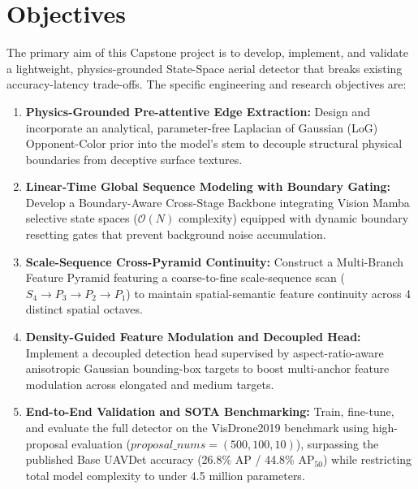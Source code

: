 \documentclass[12pt,a4paper]{report}
\begin{document}
\section{Objectives}
The primary aim of this Capstone project is to develop, implement, and validate a lightweight, physics-grounded State-Space aerial detector that breaks existing accuracy-latency trade-offs. The specific engineering and research objectives are:
\begin{enumerate}[leftmargin=2em]
    \item \textbf{Physics-Grounded Pre-attentive Edge Extraction:} Design and incorporate an analytical, parameter-free Laplacian of Gaussian (LoG) Opponent-Color prior into the model's stem to decouple structural physical boundaries from deceptive surface textures.
    \item \textbf{Linear-Time Global Sequence Modeling with Boundary Gating:} Develop a Boundary-Aware Cross-Stage Backbone integrating Vision Mamba selective state spaces ($\mathcal{O}(N)$ complexity) equipped with dynamic boundary resetting gates that prevent background noise accumulation.
    \item \textbf{Scale-Sequence Cross-Pyramid Continuity:} Construct a Multi-Branch Feature Pyramid featuring a coarse-to-fine scale-sequence scan ($S_4 \to P_3 \to P_2 \to P_1$) to maintain spatial-semantic feature continuity across 4 distinct spatial octaves.
    \item \textbf{Density-Guided Feature Modulation and Decoupled Head:} Implement a decoupled detection head supervised by aspect-ratio-aware anisotropic Gaussian bounding-box targets to boost multi-anchor feature modulation across elongated and medium targets.
    \item \textbf{End-to-End Validation and SOTA Benchmarking:} Train, fine-tune, and evaluate the full detector on the VisDrone2019 benchmark using high-proposal evaluation ($ proposal\_nums=(500, 100, 10)$), surpassing the published Base UAVDet accuracy (26.8\% AP / 44.8\% $\text{AP}_{50}$) while restricting total model complexity to under 4.5 million parameters.
\end{enumerate}
\end{document}
